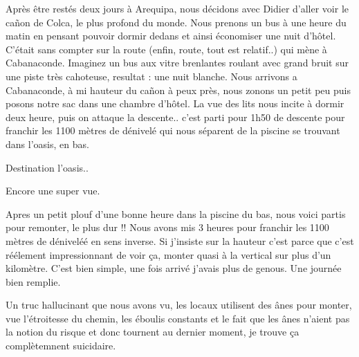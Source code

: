 \begin{multicols}{2}

Après être restés deux jours à Arequipa, nous décidons avec Didier d'aller voir le cañon de Colca, le plus profond du monde. Nous prenons un bus à une heure du matin en pensant pouvoir dormir dedans et ainsi économiser une nuit d'hôtel. C'était sans compter sur la route (enfin, route, tout est relatif..) qui mène à Cabanaconde. Imaginez un bus aux vitre brenlantes roulant avec grand bruit sur une piste très cahoteuse, resultat : une nuit blanche. Nous arrivons a Cabanaconde, à mi hauteur du cañon à peux près, nous zonons un petit peu puis posons notre sac dans une chambre d'hôtel. La vue des lits nous incite à dormir deux heure, puis on attaque la descente.. c'est parti pour 1h50 de descente pour franchir les 1100 mètres de dénivelé qui nous séparent de la piscine se trouvant dans l'oasis, en bas.


Destination l'oasis..


Encore une super vue.


Apres un petit plouf d'une bonne heure dans la piscine du bas, nous voici partis pour remonter, le plus dur !! Nous avons mis 3 heures pour franchir les 1100 mètres de déniveléé en sens inverse. Si j'insiste sur la hauteur c'est parce que c'est réélement impressionnant de voir ça, monter quasi à la vertical sur plus d'un kilomètre. C'est bien simple, une fois arrivé j'avais plus de genous. Une journée bien remplie.

Un truc hallucinant que nous avons vu, les locaux utilisent des ânes pour monter, vue l'étroitesse du chemin, les éboulis constants et le fait que les ânes n'aient pas la notion du risque et donc tournent au dernier moment, je trouve ça complètemnent suicidaire.


\end{multicols}
